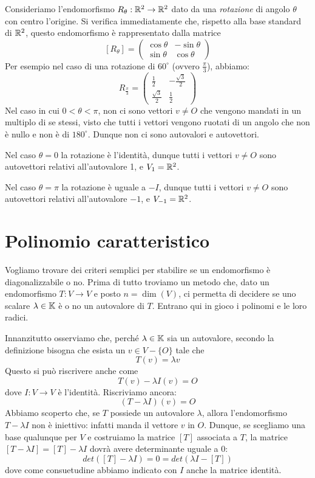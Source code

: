 \begin{example}
	Consideriamo l'endomorfismo $R_{\theta} : \mathbb{R}^2 \to \mathbb{R}^2$ dato
	da una \emph{rotazione} di angolo $\theta$ con centro l'origine. Si verifica
	immediatamente che, rispetto alla base standard di $\mathbb{R}^2$, questo
	endomorfismo è rappresentato dalla matrice
	\[
		[R_\theta] = \begin{pmatrix}
			\cos{\theta} & -\sin{\theta} \\
			\sin{\theta} & \cos{\theta}
		\end{pmatrix}
	\]
	Per esempio nel caso di una rotazione di $60^\circ$ (ovvero $\frac{\pi}{3}$),
	abbiamo:
	\[
		R_{\frac{\pi}{3}} = \begin{pmatrix}
			\frac{1}{2}        & -\frac{\sqrt{3}}{2} \\
			\frac{\sqrt{3}}{2} & \frac{1}{2}
		\end{pmatrix}
	\]
	Nel caso in cui $0 < \theta < \pi$, non ci sono vettori $v \neq O$ che vengono
	mandati in un multiplo di se stessi, visto che tutti i vettori vengono ruotati
	di un angolo che non è nullo e non è di $180^\circ$. Dunque non ci sono
	autovalori e autovettori.

	Nel caso $\theta = 0$ la rotazione è l'identità, dunque tutti i vettori
	$v \neq O$ sono autovettori relativi all'autovalore 1, e $V_1 = \mathbb{R}^2$.

	Nel caso $\theta = \pi$ la rotazione è uguale a $-I$, dunque tutti i vettori
	$v \neq O$ sono autovettori relativi all'autovalore $-1$, e
	$V_{-1} = \mathbb{R}^2$.
\end{example}

\section{Polinomio caratteristico}
Vogliamo trovare dei criteri semplici per stabilire se un endomorfismo
è diagonalizzabile o no. Prima di tutto troviamo un metodo che, dato un
endomorfismo $T : V \to V$ e posto $n = \dim(V)$, ci permetta di decidere se
uno scalare $\lambda \in \mathbb{K}$ è o no un autovalore di $T$. Entrano
qui in gioco i polinomi e le loro radici.

Innanzitutto osserviamo che, perché $\lambda \in \mathbb{K}$ sia un
autovalore, secondo la definizione bisogna che esista un $v \in V - \{O\}$
tale che
\[
	T(v) = \lambda v
\]
Questo si può riscrivere anche come
\[
	T(v) - \lambda I(v) = O
\]
dove $I : V \to V$ è l'identità. Riscriviamo ancora:
\[
	(T - \lambda I)(v) = O
\]
Abbiamo scoperto che, se $T$ possiede un autovalore $\lambda$, allora
l'endomorfismo $T - \lambda I$ non è iniettivo: infatti manda il vettore
$v$ in $O$. Dunque, se scegliamo una base qualunque per $V$ e costruiamo la
matrice $[T]$ associata a $T$, la matrice $[T - \lambda I] = [T] - \lambda I$
dovrà avere determinante uguale a 0:
\[
	det([T] - \lambda I) = 0 = det(\lambda I - [T])
\]
dove come consuetudine abbiamo indicato con $I$ anche la matrice identità.

